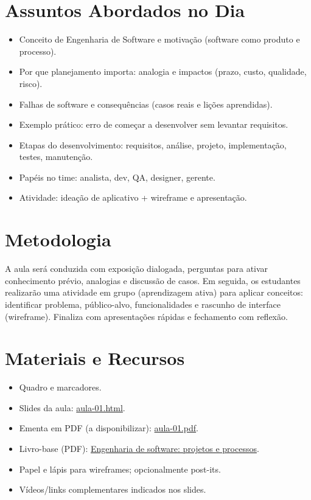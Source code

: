 \documentclass[12pt,a4paper]{article}
\begin{document}
\section{Assuntos Abordados no Dia}
\begin{itemize}[leftmargin=*,itemsep=0.25em]
  \item Conceito de Engenharia de Software e motivação (software como produto e processo).
  \item Por que planejamento importa: analogia e impactos (prazo, custo, qualidade, risco).
  \item Falhas de software e consequências (casos reais e lições aprendidas).
  \item Exemplo prático: erro de começar a desenvolver sem levantar requisitos.
  \item Etapas do desenvolvimento: requisitos, análise, projeto, implementação, testes, manutenção.
  \item Papéis no time: analista, dev, QA, designer, gerente.
  \item Atividade: ideação de aplicativo + wireframe e apresentação.
\end{itemize}

\section{Metodologia}
A aula será conduzida com exposição dialogada, perguntas para ativar conhecimento prévio, analogias e discussão de casos. Em seguida, os estudantes realizarão uma atividade em grupo (aprendizagem ativa) para aplicar conceitos: identificar problema, público-alvo, funcionalidades e rascunho de interface (wireframe). Finaliza com apresentações rápidas e fechamento com reflexão.

\section{Materiais e Recursos}
\begin{itemize}[leftmargin=*,itemsep=0.25em]
  \item Quadro e marcadores.
  \item Slides da aula: \href{aula-01.html}{aula-01.html}.
  \item Ementa em PDF (a disponibilizar): \href{aula-01.pdf}{aula-01.pdf}.
  \item Livro-base (PDF): \href{../99-Materiais/Engenharia%20de%20software%20projetos%20e%20processos%20by%20Wilson%20de%20P%C3%A1dua%20Paula%20Filho%20.epub.pdf}{Engenharia de software: projetos e processos}.
  \item Papel e lápis para wireframes; opcionalmente post-its.
  \item Vídeos/links complementares indicados nos slides.
\end{itemize}
\end{document}
